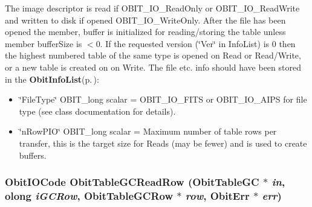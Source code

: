 The image descriptor is read if OBIT\_\-IO\_\-Read\-Only or OBIT\_\-IO\_\-Read\-Write and written to disk if opened OBIT\_\-IO\_\-Write\-Only. After the file has been opened the member, buffer is initialized for reading/storing the table unless member buffer\-Size is $<$0. If the requested version (\char`\"{}Ver\char`\"{} in Info\-List) is 0 then the highest numbered table of the same type is opened on Read or Read/Write, or a new table is created on on Write. The file etc. info should have been stored in the {\bf Obit\-Info\-List}{\rm (p.\,\pageref{structObitInfoList})}: \begin{itemize}
\item \char`\"{}File\-Type\char`\"{} OBIT\_\-long scalar = OBIT\_\-IO\_\-FITS or OBIT\_\-IO\_\-AIPS for file type (see class documentation for details). \item \char`\"{}n\-Row\-PIO\char`\"{} OBIT\_\-long scalar = Maximum number of table rows per transfer, this is the target size for Reads (may be fewer) and is used to create buffers. 
\end{itemize}
\subsubsection{\setlength{\rightskip}{0pt plus 5cm}Obit\-IOCode Obit\-Table\-GCRead\-Row ({\bf Obit\-Table\-GC} $\ast$ {\em in}, {\bf olong} {\em i\-GCRow}, {\bf Obit\-Table\-GCRow} $\ast$ {\em row}, {\bf Obit\-Err} $\ast$ {\em err})}\label{ObitTableGC_8h_a18}


